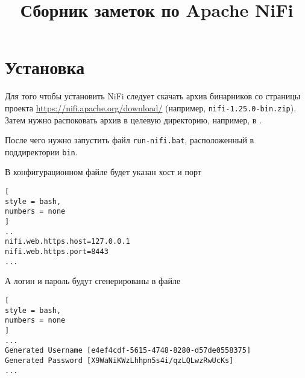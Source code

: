 \documentclass[%
	11pt,
	a4paper,
	utf8,
		]{article}
\begin{document}
\title{Сборник заметок по Apache NiFi}

\author{}

\date{}
\maketitle

\thispagestyle{fancy}

\tableofcontents

\section{Установка}

Для того чтобы установить NiFi следует скачать архив бинарников со страницы проекта \url{https://nifi.apache.org/download/} (например, \verb*|nifi-1.25.0-bin.zip|). Затем нужно распоковать архив в целевую директорию, например, в . 

После чего нужно запустить файл \verb*|run-nifi.bat|, расположенный в поддиректории \verb*|bin|.

В конфигурационном файле  будет указан хост и порт
\begin{lstlisting}[
style = bash,
numbers = none
]
..
nifi.web.https.host=127.0.0.1
nifi.web.https.port=8443
...
\end{lstlisting}

А логин и пароль будут сгенерированы в файле 
\begin{lstlisting}[
style = bash,
numbers = none
]
...
Generated Username [e4ef4cdf-5615-4748-8280-d57de0558375]
Generated Password [X9WaNiKWzLhhpn5s4i/qzLQLwzRwUcKs]
...
\end{lstlisting}






\begin{thebibliography}{99}	
\end{thebibliography}


\lstlistoflistings{}
\end{document}
